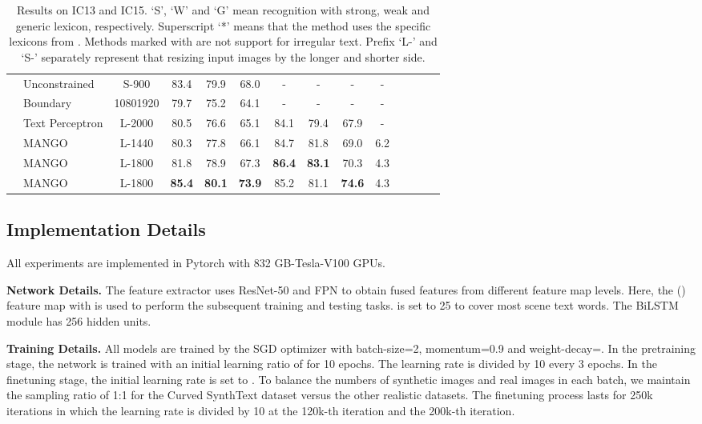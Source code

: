 \documentclass[letterpaper]{article} \usepackage{aaai21}  \usepackage{times}  \usepackage{helvet} \usepackage{courier}  \usepackage[hyphens]{url}  \usepackage{graphicx} \urlstyle{rm} \def\UrlFont{\rm}  \usepackage{natbib}  \usepackage{caption} \frenchspacing  \setlength{\pdfpagewidth}{8.5in}  \setlength{\pdfpageheight}{11in}  \usepackage{multirow}
\begin{document}
\begin{table*}[thb!]
\begin{center}
{\begin{tabular}{|c|l|c|c|c|c|c|c|c|c|c|c|c|c|}
&Unconstrained \cite{qin2019towards}  &  S-900  &  {83.4} & {79.9} & {68.0} & - & - & - &  - \\
&Boundary \cite{wang2020all} & 10801920  &  {79.7} & {75.2} & {64.1} & - & - & - &  - \\
&Text Perceptron \cite{qiao2020text}  & L-2000  &  {80.5} & {76.6} & {65.1} & 84.1 & 79.4 & 67.9 &  - \\
\cline{2-10}
&MANGO  & L-1440  &   80.3 & 77.8 & 66.1 & 84.7 & 81.8 & 69.0 & 6.2\\
&MANGO  & L-1800 &   81.8 & 78.9 & 67.3 &\textbf{ 86.4} & \textbf{83.1} & 70.3 & 4.3\\
&MANGO  & L-1800  &  \textbf{85.4} & \textbf{80.1} & \textbf{73.9} & 85.2 & 81.1& \textbf{74.6} & 4.3 \\
\hline
\end{tabular}
}
\end{center}
\caption{Results on IC13 and IC15. `S', `W' and `G' mean recognition with strong, weak and generic lexicon, respectively. Superscript `*' means that the method uses the specific lexicons from \cite{liao2019mask}.  Methods marked with  are not support for irregular text. Prefix `L-' and `S-' separately represent that resizing input images by the longer and shorter side.
}
\label{tb:1}
\end{table*}


\subsection{Implementation Details}
All experiments are implemented in Pytorch with 832 GB-Tesla-V100 GPUs.

\textbf{Network Details.}
The feature extractor uses ResNet-50 \cite{he2016deep} and FPN \cite{lin2017feature} to obtain fused features from different feature map levels.
Here, the () feature map with  is used to perform the subsequent training and testing tasks.
 is set to 25 to cover most scene text words. The BiLSTM module has 256 hidden units.

\textbf{Training Details.}
All models are trained by the SGD optimizer with batch-size=2, momentum=0.9 and weight-decay=.
In the pretraining stage, the network is trained with an initial learning ratio of  for 10 epochs.
The learning rate is divided by 10 every 3 epochs.
In the finetuning stage, the initial learning rate is set to .
To balance the numbers of synthetic images and real images in each batch, we maintain the sampling ratio of 1:1 for the Curved SynthText dataset versus the other realistic datasets.
The finetuning process lasts for 250k iterations in which the learning rate is divided by 10 at the 120k-th iteration and the 200k-th iteration.
\end{document}
